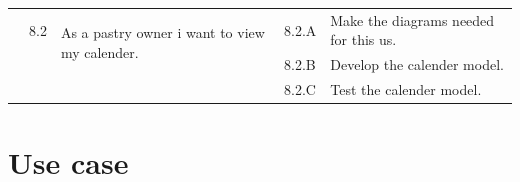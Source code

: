\documentclass[12pt,a4paper]{report}
\begin{document}
\begin{table}[H]
\begin{center}
\begin{tabular}{|  p{3cm}|  p{1cm}| p{4cm}|  p{1cm}| p{6cm}|}
			&                       
			8.2  &  
			\multirow{2}{4cm}{As a pastry owner i want to view my calender.}
			
			&				                      
			8.2.A &                        
			Make the diagrams needed for this \ac{us}.
			\\ 
			\cline{4-5}    
			&                   
			&                                 
			&                        
			8.2.B &                        
			Develop the calender model.
			\\ 
			\cline{4-5}    
			&                   
			&                                 
			&                        
			8.2.C &                        
			Test the calender model.
			
			\\
			\hline
		\end{tabular}
		
	\end{center}
	
\end{table}
\clearpage
	\section{Use case}
\end{document}
